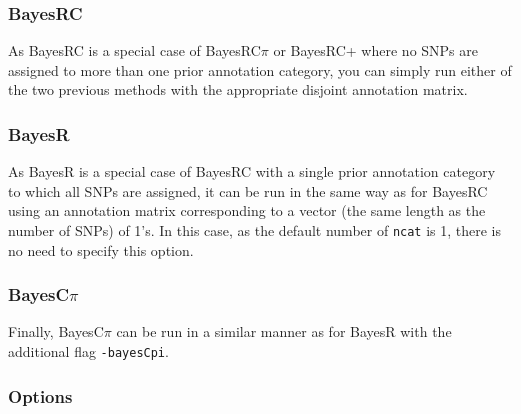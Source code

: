 \documentclass{ol-softwaremanual}
\begin{document}
\subsubsection{BayesRC}

As BayesRC is a special case of BayesRC$\pi$ or BayesRC+ where no SNPs are assigned to more than one prior annotation category, you can simply run either of the two previous methods with the appropriate disjoint annotation matrix.

\subsubsection{BayesR}

As BayesR is a special case of BayesRC with a single prior annotation category to which all SNPs are assigned, it can be run in the same way as for BayesRC using an annotation matrix corresponding to a vector (the same length as the number of SNPs) of 1's.
In this case, as the default number of \texttt{ncat} is 1, there is no need to specify this option.

\subsubsection{BayesC$\pi$}

Finally, BayesC$\pi$ can be run in a similar manner as for BayesR with the additional flag \texttt{-bayesCpi}.

\subsubsection{Options}
\end{document}
